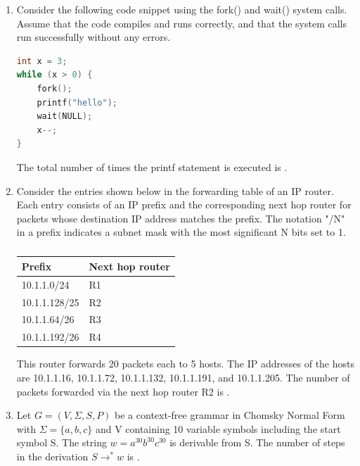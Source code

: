 \documentclass[a4paper, 11pt]{article}
\begin{document}
\begin{enumerate}
    \hfill{}

    \item Consider the following code snippet using the fork() and wait() system calls. Assume that the code compiles and runs correctly, and that the system calls run successfully without any errors.
    \begin{lstlisting}[language=C]
int x = 3;
while (x > 0) {
    fork();
    printf("hello");
    wait(NULL);
    x--;
}
    \end{lstlisting}
    The total number of times the printf statement is executed is \underline{\hspace{2cm}}.

    \hfill{}

    \item Consider the entries shown below in the forwarding table of an IP router. Each entry consists of an IP prefix and the corresponding next hop router for packets whose destination IP address matches the prefix. The notation "/N" in a prefix indicates a subnet mask with the most significant N bits set to 1.
    
    \begin{table}[H]
        \centering
        \begin{tabular}{|l|l|}
        \hline
        \textbf{Prefix} & \textbf{Next hop router} \\
        \hline
        10.1.1.0/24 & R1 \\
        \hline
        10.1.1.128/25 & R2 \\
        \hline
        10.1.1.64/26 & R3 \\
        \hline
        10.1.1.192/26 & R4 \\
        \hline
        \end{tabular}
        \caption*{}
        \label{tab:q58}
    \end{table}
    
    This router forwards 20 packets each to 5 hosts. The IP addresses of the hosts are 10.1.1.16, 10.1.1.72, 10.1.1.132, 10.1.1.191, and 10.1.1.205. The number of packets forwarded via the next hop router R2 is \underline{\hspace{2cm}}.

    \hfill{}

    \item Let $G=(V, \Sigma, S, P)$ be a context-free grammar in Chomsky Normal Form with $\Sigma=\{a,b,c\}$ and V containing 10 variable symbols including the start symbol S. The string $w=a^{30}b^{30}c^{30}$ is derivable from S. The number of steps  in the derivation $S \rightarrow^* w$ is \underline{\hspace{2cm}}.
    

\end{enumerate}
\end{document}

